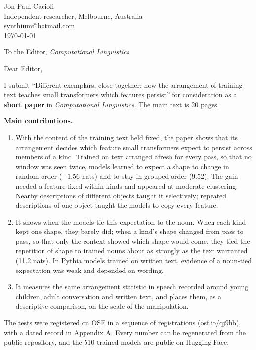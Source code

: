\documentclass[11pt,a4paper]{article}
\begin{document}
\begin{flushright}
Jon-Paul Cacioli\\
Independent researcher, Melbourne, Australia\\
\href{mailto:synthium@hotmail.com}{synthium@hotmail.com}\\[6pt]
\today
\end{flushright}

To the Editor, \textit{Computational Linguistics}

Dear Editor,

I submit ``Different exemplars, close together: how the arrangement of training text teaches small transformers which features persist'' for consideration as a \textbf{short paper} in \textit{Computational Linguistics}. The main text is 20 pages.

\textbf{Main contributions.}
\begin{enumerate}[leftmargin=*,itemsep=2pt]
\item With the content of the training text held fixed, the paper shows that its arrangement decides which feature small transformers expect to persist across members of a kind. Trained on text arranged afresh for every pass, so that no window was seen twice, models learned to expect a shape to change in random order ($-1.56$ nats) and to stay in grouped order (9.52). The gain needed a feature fixed within kinds and appeared at moderate clustering. Nearby descriptions of different objects taught it selectively; repeated descriptions of one object taught the models to copy every feature.
\item It shows when the models tie this expectation to the noun. When each kind kept one shape, they barely did; when a kind's shape changed from pass to pass, so that only the context showed which shape would come, they tied the repetition of shape to trained nouns about as strongly as the text warranted (11.2 nats). In Pythia models trained on written text, evidence of a noun-tied expectation was weak and depended on wording.
\item It measures the same arrangement statistic in speech recorded around young children, adult conversation and written text, and places them, as a descriptive comparison, on the scale of the manipulation.
\end{enumerate}

The tests were registered on OSF in a sequence of registrations (\href{https://osf.io/qj9hb}{osf.io/qj9hb}), with a dated record in Appendix A. Every number can be regenerated from the public repository, and the 510 trained models are public on Hugging Face.
\end{document}
